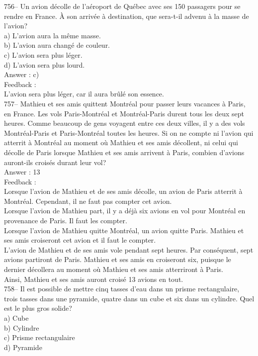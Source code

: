 \documentclass[letterpaper, 12pt]{article}
\begin{document}
756-- Un avion d\'ecolle de l'a\'eroport de Qu\'ebec avec ses 150 passagers
pour se rendre en France.  \`A son arriv\'ee \`a destination, que sera-t-il
advenu \`a la masse de l'avion?\\
a) L'avion aura la m\^eme masse.\\
b) L'avion aura chang\'e de couleur.\\
c) L'avion sera plus l\'eger.\\
d) L'avion sera plus lourd.\\

Answer : c)\\

Feedback : \\
L'avion sera plus l\'eger, car il aura br\^ul\'e son essence.\\

757-- Mathieu et ses amis quittent Montr\'eal pour passer leurs vacances \`a
Paris, en France.  Les vols Paris-Montr\'eal et Montr\'eal-Paris durent tous
les deux sept heures.  Comme beaucoup de gens voyagent entre ces deux
villes, il y a des vols Montr\'eal-Paris et Paris-Montr\'eal toutes les
heures.  Si on ne compte ni l'avion qui atterrit \`a Montr\'eal au moment
o\`u Mathieu et ses amis d\'ecollent, ni celui qui d\'ecolle de Paris
lorsque Mathieu et ses amis arrivent \`a Paris, combien d'avions auront-ils
crois\'es durant leur vol?\\

Answer : 13\\

Feedback : \\
Lorsque l'avion de Mathieu et de ses amis d\'ecolle, un avion de Paris
atterrit \`a Montr\'eal. Cependant, il ne faut pas compter cet avion.\\
Lorsque l'avion de Mathieu part, il y a d\'ej\`a six avions en vol pour
Montr\'eal en provenance de Paris.  Il faut les compter.\\
Lorsque l'avion de Mathieu quitte Montr\'eal, un avion quitte Paris.
Mathieu et ses amis croiseront cet avion et il faut le compter.\\
L'avion de Mathieu et de ses amis vole pendant sept heures.  Par
cons\'equent, sept avions partiront de Paris.  Mathieu et ses amis en
croiseront six, puisque le dernier d\'ecollera au moment o\`u Mathieu et ses
amis atterriront \`a Paris.\\
Ainsi, Mathieu et ses amis auront crois\'e 13 avions en tout.  \\

758-- Il est possible de mettre cinq tasses d'eau dans un prisme
rectangulaire, trois tasses dans une pyramide, quatre dans un cube et six
dans un cylindre.  Quel est le plus gros solide?\\
a) Cube\\
b) Cylindre\\
c) Prisme rectangulaire\\
d) Pyramide\\
\end{document}
